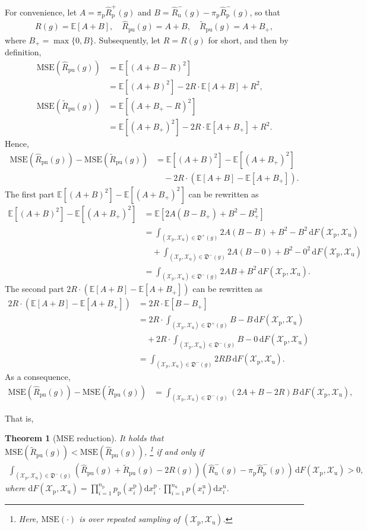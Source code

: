 \documentclass[12pt]{article}
\newcommand{\dif}{\mathrm{d}}
\newcommand{\mse}{\mathrm{MSE}}
\newcommand{\bE}{\mathbb{E}}
\newcommand{\cX}{\mathcal{X}}
\newcommand{\fD}{\mathfrak{D}}
\newcommand{\prp}{p_\mathrm{p}}
\newcommand{\pip}{\pi_\mathrm{p}}
\newcommand{\Xp}{\cX_\mathrm{p}}
\newcommand{\Xu}{\cX_\mathrm{u}}
\newcommand{\xp}{x^\mathrm{p}}
\newcommand{\xu}{x^\mathrm{u}}
\newcommand{\Np}{{n_\mathrm{p}}}
\newcommand{\Nu}{{n_\mathrm{u}}}
\newcommand{\hRp}{\widehat{R}_\mathrm{p}}
\newcommand{\hRu}{\widehat{R}_\mathrm{u}}
\newcommand{\hRpu}{\widehat{R}_\mathrm{pu}}
\newcommand{\tRpu}{\widetilde{R}_\mathrm{pu}}
\newtheorem{thm}{Theorem}[section]
\theoremstyle{definition}
\begin{document}
For convenience, let $A=\pip\hRp^+(g)$ and $B=\hRu^-(g)-\pip\hRp^-(g)$, so that
\begin{align*}
R(g)=\bE[A+B],\quad
\hRpu(g)=A+B,\quad
\tRpu(g)=A+B_+,
\end{align*}
where $B_+=\max\{0,B\}$. Subsequently, let $R=R(g)$ for short, and then by definition,
\begin{align*}
\mse(\hRpu(g))
&= \bE[(A+B-R)^2]\\
&= \bE[(A+B)^2]-2R\cdot\bE[A+B]+R^2,\\
\mse(\tRpu(g))
&= \bE[(A+B_+-R)^2]\\
&= \bE[(A+B_+)^2]-2R\cdot\bE[A+B_+]+R^2.
\end{align*}
Hence,
\begin{align*}
\mse(\hRpu(g))-\mse(\tRpu(g))
&= \bE[(A+B)^2]-\bE[(A+B_+)^2]\\
&\quad -2R\cdot(\bE[A+B]-\bE[A+B_+]).
\end{align*}
The first part $\bE[(A+B)^2]-\bE[(A+B_+)^2]$ can be rewritten as
\begin{align*}
\bE[(A+B)^2]-\bE[(A+B_+)^2]
&= \bE[2A(B-B_+)+B^2-B_+^2]\\
&= \int_{(\Xp,\Xu)\in\fD^+(g)}2A(B-B)+B^2-B^2\,\dif F(\Xp,\Xu)\\
&\quad +\int_{(\Xp,\Xu)\in\fD^-(g)}2A(B-0)+B^2-0^2\,\dif F(\Xp,\Xu)\\
&= \int_{(\Xp,\Xu)\in\fD^-(g)}2AB+B^2\,\dif F(\Xp,\Xu).
\end{align*}
The second part $2R\cdot(\bE[A+B]-\bE[A+B_+])$ can be rewritten as
\begin{align*}
2R\cdot(\bE[A+B]-\bE[A+B_+])
&= 2R\cdot\bE[B-B_+]\\
&= 2R\cdot\int_{(\Xp,\Xu)\in\fD^+(g)}B-B\,\dif F(\Xp,\Xu)\\
&\quad +2R\cdot\int_{(\Xp,\Xu)\in\fD^-(g)}B-0\,\dif F(\Xp,\Xu)\\
&= \int_{(\Xp,\Xu)\in\fD^-(g)}2RB\,\dif F(\Xp,\Xu).
\end{align*}
As a consequence,
\begin{align*}
\mse(\hRpu(g))-\mse(\tRpu(g))
&= \int_{(\Xp,\Xu)\in\fD^-(g)}(2A+B-2R)B\,\dif F(\Xp,\Xu),
\end{align*}

That is,
\begin{thm}[MSE reduction]
	\label{thm:mse}%
	It holds that $\mse(\tRpu(g))<\mse(\hRpu(g))$,%
	\footnote{Here, $\mse(\cdot)$ is over repeated sampling of $(\Xp,\Xu)$.}
	if and only if
	\begin{align}
	\label{eq:mse-cond}%
	\int_{(\Xp,\Xu)\in\fD^-(g)}(\hRpu(g)+\tRpu(g)-2R(g))
	(\hRu^-(g)-\pip\hRp^-(g))\,\dif F(\Xp,\Xu) > 0,
	\end{align}
	where $\dif F(\Xp,\Xu)=\prod_{i=1}^\Np\prp(\xp_i)\dif\xp_i\cdot\prod_{i=1}^\Nu p(\xu_i)\dif\xu_i$.
\end{thm}
\end{document}
